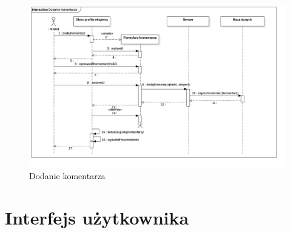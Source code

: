 \documentclass[10pt, titlepage, oneside, a4paper]{article}
\begin{document}
	\begin{figure}[h]
		\centering
		\includegraphics[width=0.9\textwidth{}]{Dodanie_komentarza.png}
		\caption{Dodanie komentarza}
		\label{fig:sequenceDiagramAddComment}
	\end{figure}

  
\section{Interfejs użytkownika}
  
\end{document}
